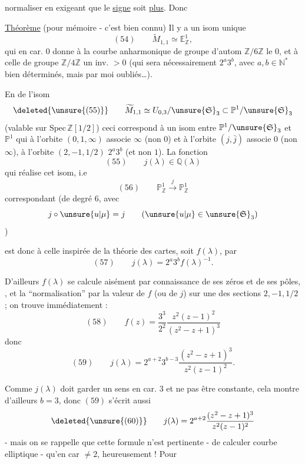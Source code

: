 
normaliser en exigeant que le \uline{signe} soit \uline{plus}. Donc

\uline{Théorème} (pour mémoire - c'est bien connu) Il y a un isom unique
\[
(54)\qquad
\widetilde M_{1,1}\simeq\mathbb E^1_{\mathbb Z},
\]
qui  en car. $0$ donne à la courbe anharmonique de groupe
d'autom $\mathbb Z/6\mathbb Z$ le
 $0$, et à celle de
groupe $\mathbb Z/4\mathbb Z$ un inv.  $>0$
(qui sera nécessairement $2^a3^b$, avec $a,b\in\mathbb N^*$ bien
déterminés, mais par moi oubliés\ldots).

En  de l'isom
\[
\deleted{\unsure{(55)}}\qquad
\widetilde M_{1,1}\simeq U_{0,3}/\unsure{\mathfrak S}_3
\subset \mathbb P^1/\unsure{\mathfrak S}_3
\]
(valable sur $\mathrm{Spec}\,\mathbb Z[1/2]$)
ceci correspond à  un isom entre
$\mathbb P^1/\unsure{\mathfrak S}_3$ et $\mathbb P^1$ qui à l'orbite
$(0,1,\infty)$ associe $\infty$ (non $0$) et à l'orbite $(j,\bar j)$
associe $0$ (non $\infty$), à l'orbite $(2,-1,1/2)$
 $2^a3^b$ (et non $1$). La fonction
\[
(55)\qquad j(\lambda)\in\mathbb Q(\lambda)
\]
qui réalise cet isom, i.e 
\[
(56)\qquad
\mathbb P^1_{\mathbb Z}\xrightarrow{j}\mathbb P^1_{\mathbb Z}
\]
correspondant (de degré $6$, avec
\[
j\circ\unsure{u|\mu}=j
\qquad(\unsure{u|\mu}\in\unsure{\mathfrak S}_3)
\]
)


est donc  à celle inspirée de la théorie des cartes,
soit $f(\lambda)$, par
\[
(57)\qquad
j(\lambda)=2^a3^b f(\lambda)^{-1}.
\]

D'ailleurs $f(\lambda)$  se calcule aisément
par connaissance de ses zéros et de ses pôles,
,
 et la ``normalisation'' par la valeur de $f$
(ou de $j$) sur une des sections $2,-1,1/2$ ; on trouve immédiatement :
\[
(58)\qquad
f(z)=\frac{3^3}{2^2}\frac{z^2(z-1)^2}{(z^2-z+1)^3}
\]
donc
\[
(59)\qquad
j(\lambda)=2^{a+2}3^{b-3}\frac{(z^2-z+1)^3}{z^2(z-1)^2}.
\]

Comme $j(\lambda)$ doit garder un sens en car. $3$ et ne pas être
constante, cela montre d'ailleurs \uline{$b=3$}, donc $(59)$ s'écrit aussi
\[
\deleted{\unsure{(60)}}\qquad
j(\lambda)=2^{a+2}\frac{(z^2-z+1)^3}{z^2(z-1)^2}
\]
- mais on se rappelle que cette formule n'est pertinente -
 de calculer
courbe elliptique - qu'en car $\ne 2$, heureusement !
Pour 


